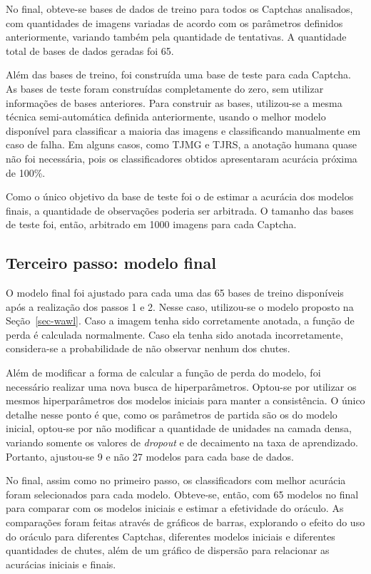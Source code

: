 \documentclass[12pt,twoside,brazilian]{book}
\begin{document}
No final, obteve-se bases de dados de treino para todos os Captchas
analisados, com quantidades de imagens variadas de acordo com os
parâmetros definidos anteriormente, variando também pela quantidade de
tentativas. A quantidade total de bases de dados geradas foi 65.

Além das bases de treino, foi construída uma base de teste para cada
Captcha. As bases de teste foram construídas completamente do zero, sem
utilizar informações de bases anteriores. Para construir as bases,
utilizou-se a mesma técnica semi-automática definida anteriormente,
usando o melhor modelo disponível para classificar a maioria das imagens
e classificando manualmente em caso de falha. Em alguns casos, como TJMG
e TJRS, a anotação humana quase não foi necessária, pois os
classificadores obtidos apresentaram acurácia próxima de 100\%.

Como o único objetivo da base de teste foi o de estimar a acurácia dos
modelos finais, a quantidade de observações poderia ser arbitrada. O
tamanho das bases de teste foi, então, arbitrado em 1000 imagens para
cada Captcha.

\hypertarget{sec-modelo-final}{%
\subsection{Terceiro passo: modelo final}\label{sec-modelo-final}}

O modelo final foi ajustado para cada uma das 65 bases de treino
disponíveis após a realização dos passos 1 e 2. Nesse caso, utilizou-se
o modelo proposto na Seção~\ref{sec-wawl}. Caso a imagem tenha sido
corretamente anotada, a função de perda é calculada normalmente. Caso
ela tenha sido anotada incorretamente, considera-se a probabilidade de
não observar nenhum dos chutes.

Além de modificar a forma de calcular a função de perda do modelo, foi
necessário realizar uma nova busca de hiperparâmetros. Optou-se por
utilizar os mesmos hiperparâmetros dos modelos iniciais para manter a
consistência. O único detalhe nesse ponto é que, como os parâmetros de
partida são os do modelo inicial, optou-se por não modificar a
quantidade de unidades na camada densa, variando somente os valores de
\emph{dropout} e de decaimento na taxa de aprendizado. Portanto,
ajustou-se 9 e não 27 modelos para cada base de dados.

No final, assim como no primeiro passo, os classificadors com melhor
acurácia foram selecionados para cada modelo. Obteve-se, então, com 65
modelos no final para comparar com os modelos iniciais e estimar a
efetividade do oráculo. As comparações foram feitas através de gráficos
de barras, explorando o efeito do uso do oráculo para diferentes
Captchas, diferentes modelos iniciais e diferentes quantidades de
chutes, além de um gráfico de dispersão para relacionar as acurácias
iniciais e finais.
\end{document}
